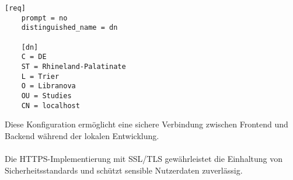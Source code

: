 \begin{lstlisting}[caption={localhost.conf}]
	[req]
	prompt = no
	distinguished_name = dn
	
	[dn]
	C = DE
	ST = Rhineland-Palatinate
	L = Trier
	O = Libranova
	OU = Studies
	CN = localhost
\end{lstlisting}
Diese Konfiguration ermöglicht eine sichere Verbindung zwischen Frontend und Backend während der lokalen Entwicklung. \\ \\
Die HTTPS-Implementierung mit SSL/TLS gewährleistet die Einhaltung von Sicherheitsstandards und schützt sensible Nutzerdaten zuverlässig.
















